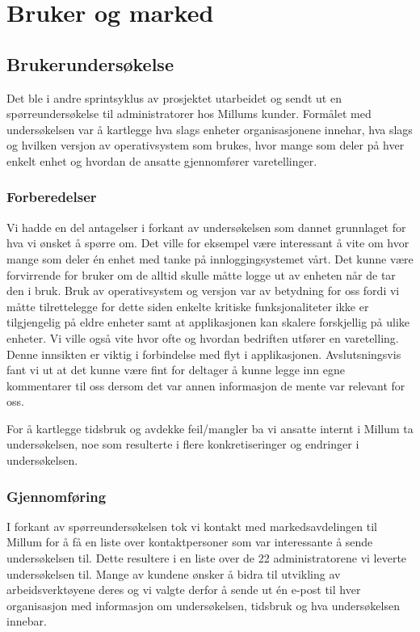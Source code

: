 \chapter{\textbf{Bruker og marked}}
\section{\textbf{Brukerundersøkelse}}
Det ble i andre sprintsyklus av prosjektet utarbeidet og sendt ut en spørreundersøkelse til administratorer hos Millums kunder. Formålet med undersøkelsen var å kartlegge hva slags enheter organisasjonene innehar, hva slags og hvilken versjon av operativsystem som brukes, hvor mange som deler på hver enkelt enhet og hvordan de ansatte gjennomfører varetellinger.

\subsection{\textbf{Forberedelser}}
Vi hadde en del antagelser i forkant av undersøkelsen som dannet grunnlaget for hva vi ønsket å spørre om. Det ville for eksempel være interessant å vite om hvor mange som deler én enhet med tanke på innloggingsystemet vårt. Det kunne være forvirrende for bruker om de alltid skulle måtte logge ut av enheten når de tar den i bruk. Bruk av operativsystem og versjon var av betydning for oss fordi vi måtte tilrettelegge for dette siden enkelte kritiske funksjonaliteter ikke er tilgjengelig på eldre enheter samt at applikasjonen kan skalere forskjellig på ulike enheter. Vi ville også vite hvor ofte og hvordan bedriften utfører en varetelling. Denne innsikten er viktig i forbindelse med flyt i applikasjonen. Avslutsningsvis fant vi ut at det kunne være fint for deltager å kunne legge inn egne kommentarer til oss dersom det var annen informasjon de mente var relevant for oss.

For å kartlegge tidsbruk og avdekke feil/mangler ba vi ansatte internt i Millum ta undersøkelsen, noe som resulterte i flere konkretiseringer og endringer i undersøkelsen.

\subsection{\textbf{Gjennomføring}}
I forkant av spørreundersøkelsen tok vi kontakt med markedsavdelingen til Millum for å få en liste over kontaktpersoner som var interessante å sende undersøkelsen til. Dette resultere i en liste over de 22 administratorene vi leverte undersøkelsen til. Mange av kundene ønsker å bidra til utvikling av arbeidsverktøyene deres og vi valgte derfor å sende ut én e-post til hver organisasjon med informasjon om undersøkelsen, tidsbruk og hva undersøkelsen innebar.

